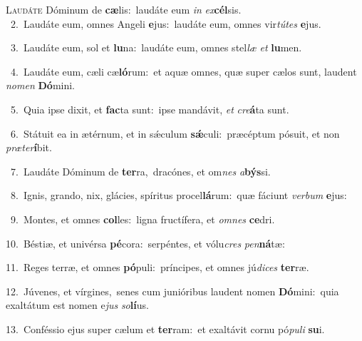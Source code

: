 \lettrine{\initial\textcolor{\initialcolor}{L}}{audáte} Dóminum de \textbf{cæ}\-lis:~\star laudáte eum \textit{in} \textit{ex}\-\textbf{cél}sis.\\
{\numbfont\textcolor{\numbcolor}{~2.}}~Laudáte eum, omnes Angeli \textbf{e}\-jus:~\star laudáte eum, omnes vir\-\textit{tú}\-\textit{tes} \textbf{e}\-jus.\par
{\numbfont\textcolor{\numbcolor}{~3.}}~Laudáte eum, sol et \textbf{lu}\-na:~\star laudáte eum, omnes stel\textit{læ} \textit{et} \textbf{lu}\-men.\par
{\numbfont\textcolor{\numbcolor}{~4.}}~Laudáte eum, cæli cæ\-\textbf{ló}\-rum:~\star et aquæ omnes, quæ super cælos sunt, laudent \textit{no}\-\textit{men} \textbf{Dó}\-mini.\par
{\numbfont\textcolor{\numbcolor}{~5.}}~Quia ipse dixit, et \textbf{fac}\-ta sunt:~\star ipse mandávit, \textit{et} \textit{cre}\-\textbf{á}ta sunt.\par
{\numbfont\textcolor{\numbcolor}{~6.}}~Státuit ea in ætérnum, et in sǽculum \textbf{sǽ}\-culi:~\star præcéptum pósuit, et non \textit{præ}\-\textit{ter}\textbf{í}bit.\par
{\numbfont\textcolor{\numbcolor}{~7.}}~Laudáte Dóminum de \textbf{ter}\-ra,~\star dracónes, et om\textit{nes} \textit{a}\-\textbf{býs}si.\par
{\numbfont\textcolor{\numbcolor}{~8.}}~Ignis, grando, nix, glácies, spíritus procel\-\textbf{lá}\-rum:~\star quæ fáciunt \textit{ver}\-\textit{bum} \textbf{e}\-jus:\par
{\numbfont\textcolor{\numbcolor}{~9.}}~Montes, et omnes \textbf{col}\-les:~\star ligna fructífera, et \textit{om}\-\textit{nes} \textbf{ce}\-dri.\par
{\numbfont\textcolor{\numbcolor}{10.}}~Béstiæ, et univérsa \textbf{pé}\-cora:~\star serpéntes, et vólu\textit{cres} \textit{pen}\-\textbf{ná}tæ:\par
{\numbfont\textcolor{\numbcolor}{11.}}~Reges terræ, et omnes \textbf{pó}\-puli:~\star príncipes, et omnes jú\-\textit{di}\-\textit{ces} \textbf{ter}\-ræ.\par
{\numbfont\textcolor{\numbcolor}{12.}}~Júvenes, et vírgines,~\dagger senes cum junióribus laudent nomen \textbf{Dó}\-mini:~\star quia exaltátum est nomen e\textit{jus} \textit{so}\-\textbf{lí}us.\par
{\numbfont\textcolor{\numbcolor}{13.}}~Conféssio ejus super cælum et \textbf{ter}\-ram:~\star et exaltávit cornu pó\-\textit{pu}\-\textit{li} \textbf{su}\-i.\par
